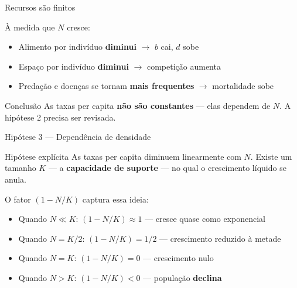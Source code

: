 \documentclass[12pt]{beamer}
\begin{document}
\begin{frame}{Recursos são finitos}

  À medida que $N$ cresce:

  \bigskip
  \begin{itemize}
    \item Alimento por indivíduo \textbf{diminui} $\rightarrow$
      $b$ cai, $d$ sobe
    \item Espaço por indivíduo \textbf{diminui} $\rightarrow$
      competição aumenta
    \item Predação e doenças se tornam \textbf{mais frequentes}
      $\rightarrow$ mortalidade sobe
  \end{itemize}

  \bigskip
  \begin{exampleblock}{Conclusão}
    As taxas per capita \textbf{não são constantes} ---
    elas dependem de $N$.
    A hipótese 2 precisa ser revisada.
  \end{exampleblock}

\end{frame}

\begin{frame}{Hipótese 3 — Dependência de densidade}

  \begin{exampleblock}{Hipótese explícita}
    As taxas per capita diminuem linearmente com $N$.
    Existe um tamanho $K$ --- a \textbf{capacidade de suporte} ---
    no qual o crescimento líquido se anula.
  \end{exampleblock}

  \bigskip
  O fator $(1 - N/K)$ captura essa ideia:

  \bigskip
  \begin{itemize}
    \item Quando $N \ll K$: \quad $(1 - N/K) \approx 1$
      --- cresce quase como exponencial
    \item Quando $N = K/2$: \quad $(1 - N/K) = 1/2$
      --- crescimento reduzido à metade
    \item Quando $N = K$: \quad $(1 - N/K) = 0$
      --- crescimento nulo
    \item Quando $N > K$: \quad $(1 - N/K) < 0$
      --- população \textbf{declina}
  \end{itemize}

\end{frame}
\end{document}
